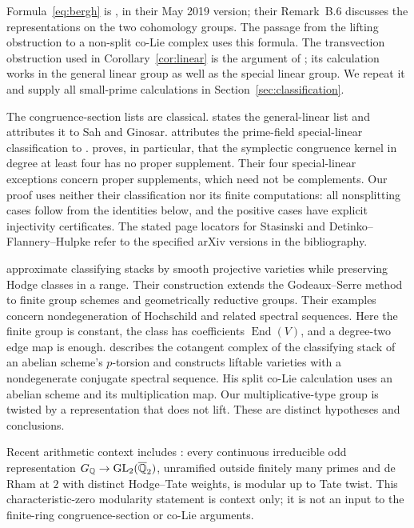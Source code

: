 \documentclass[11pt]{article}
\DeclareMathOperator{\End}{End}\DeclareMathOperator{\Hom}{Hom}
\theoremstyle{definition}\newtheorem{definition}[theorem]{Definition}
\theoremstyle{remark}\newtheorem{remark}[theorem]{Remark}
\begin{document}
Formula~\eqref{eq:bergh} is \citet[Proposition~B.4, pp.~33--34]{BerghRydh}, in their May 2019 version; their Remark~B.6 discusses the representations on the two cohomology groups. The passage from the lifting obstruction to a non-split co-Lie complex uses this formula. The transvection obstruction used in Corollary~\ref{cor:linear} is the argument of \citet[Theorem~6.2, pp.~12--13]{Stasinski}; its calculation works in the general linear group as well as the special linear group. We repeat it and supply all small-prime calculations in Section~\ref{sec:classification}.

The congruence-section lists are classical. \citet[p.~3]{Singla} states the general-linear list and attributes it to Sah and Ginosar. \citet[\S6, p.~12]{Stasinski} attributes the prime-field special-linear classification to \citet[Theorem~7]{Sah74}. \citet[Theorem~2.5, pp.~4--6]{DFH} proves, in particular, that the symplectic congruence kernel in degree at least four has no proper supplement. Their four special-linear exceptions concern proper supplements, which need not be complements. Our proof uses neither their classification nor its finite computations: all nonsplitting cases follow from the identities below, and the positive cases have explicit injectivity certificates. The stated page locators for Stasinski and Detinko--Flannery--Hulpke refer to the specified arXiv versions in the bibliography.

\citet[Theorem~1.2, p.~2, and its proof in \S6, p.~18]{ABM} approximate classifying stacks by smooth projective varieties while preserving Hodge classes in a range. Their construction extends the Godeaux--Serre method to finite group schemes and geometrically reductive groups. Their examples concern nondegeneration of Hochschild and related spectral sequences. Here the finite group is constant, the class has coefficients $\End(V)$, and a degree-two edge map is enough. \citet[Lemma~10.5, pp.~62--63, and Corollary~10.7, pp.~65--66]{Petrov} describes the cotangent complex of the classifying stack of an abelian scheme's $p$-torsion and constructs liftable varieties with a nondegenerate conjugate spectral sequence. His split co-Lie calculation uses an abelian scheme and its multiplication map. Our multiplicative-type group is twisted by a representation that does not lift. These are distinct hypotheses and conclusions.

Recent arithmetic context includes \citet[Theorem~1.1, p.~1]{OpenAI2026}: every continuous irreducible odd representation $G_{\mathbb Q}\to\operatorname{GL}_2(\overline{\mathbb Q}_2)$, unramified outside finitely many primes and de Rham at $2$ with distinct Hodge--Tate weights, is modular up to Tate twist. This characteristic-zero modularity statement is context only; it is not an input to the finite-ring congruence-section or co-Lie arguments.
\end{document}
